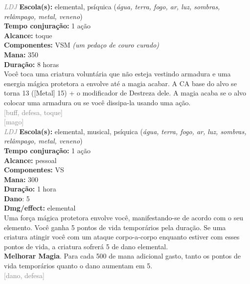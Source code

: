 \documentclass{RPG_Adventure}[2021/10/20]
\begin{document}
{\tiny \textcolor{gray}{\textit{LDJ}}}
{\small \t \textbf{Escola(s):} elemental, psíquica (\textit{água, terra, fogo, ar, luz, sombras, relâmpago, metal, veneno})\\\t \textbf{Tempo conjuração:} 1 ação\\\t \textbf{Alcance:} toque\\\t \textbf{Componentes:} VSM \textit{(um pedaço de couro curado)}\\\t \textbf{Mana:} 350\\\t \textbf{Duração:} 8 horas\\}
{\normalsize Você toca uma criatura voluntária que não esteja vestindo armadura e uma energia mágica protetora a envolve até a magia acabar. A CA base do alvo se torna 13 ([Metal] 15) + o modificador de Destreza dele. A magia acaba se o alvo colocar uma armadura ou se você dissipa-la usando uma ação.\\}
{\scriptsize \textcolor{gray}{[buff, defesa, toque]\\}}
{\scriptsize \textcolor{gray}{[mago]\\}}
{\tiny \textcolor{gray}{\textit{LDJ}}}
{\small \t \textbf{Escola(s):} elemental, musical, psíquica (\textit{água, terra, fogo, ar, luz, sombras, relâmpago, metal, veneno})\\\t \textbf{Tempo conjuração:} 1 ação\\\t \textbf{Alcance:} pessoal\\\t \textbf{Componentes:} VS\\\t \textbf{Mana:} 300\\\t \textbf{Duração:} 1 hora\\\t \textbf{Dano}: 5\\\t \textbf{Dmg/effect:} elemental\\}
{\normalsize Uma força mágica protetora envolve você, manifestando-se de acordo com o seu elemento. Você ganha 5 pontos de vida temporários pela duração. Se uma criatura atingir você com um ataque corpo-a-corpo enquanto estiver com esses pontos de vida, a criatura sofrerá 5 de dano elemental.\\\t \textbf{Melhorar Magia}. Para cada 500 de mana adicional gasto, tanto os pontos de vida temporários quanto o dano aumentam em 5.\\}
{\scriptsize \textcolor{gray}{[dano, defesa]\\}}
\end{document}
